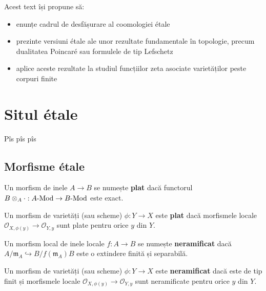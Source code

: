 \documentclass[13pt]{book}
\begin{document}
Acest text își propune să:

\begin{itemize}
\item enunțe cadrul de desfășurare al coomologiei étale
\item prezinte versiuni étale ale unor rezultate fundamentale în topologie, precum dualitatea Poincaré sau formulele de tip Lefschetz
\item aplice aceste rezultate la studiul funcțiilor zeta asociate varietăților peste corpuri finite
\end{itemize}

\setcounter{secnumdepth}{2}

\chapter{Situl étale}
\setcounter{page}{1}

Pîs pîs pîs

\section{Morfisme étale}

\begin{defi}
Un morfism de inele $A \rightarrow B$ se numește {\bf plat} dacă functorul $B \otimes_A \cdot :  A\textnormal{-Mod} \rightarrow B\textnormal{-Mod}$ este exact.
\end{defi}

\begin{defi}
Un morfism de varietăți (sau scheme) $\phi: Y \rightarrow X$ este {\bf plat} dacă morfismele locale $\mathcal{O}_{X,\phi(y)} \rightarrow \mathcal{O}_{Y,y}$ sunt plate pentru orice $y$ din $Y$.
\end{defi}

\begin{defi}
Un morfism local de inele locale $f: A \rightarrow B$ se numește {\bf neramificat} dacă $A/\mathfrak{m}_A \hookrightarrow B/f(\mathfrak{m}_A)B$ este o extindere finită și separabilă.
\end{defi}


\begin{defi}
Un morfism de varietăți (sau scheme) $\phi: Y \rightarrow X$ este {\bf neramificat} dacă este de tip finit și morfismele locale $\mathcal{O}_{X,\phi(y)} \rightarrow \mathcal{O}_{Y,y}$ sunt neramificate pentru orice $y$ din $Y$.
\end{defi}
\end{document}
